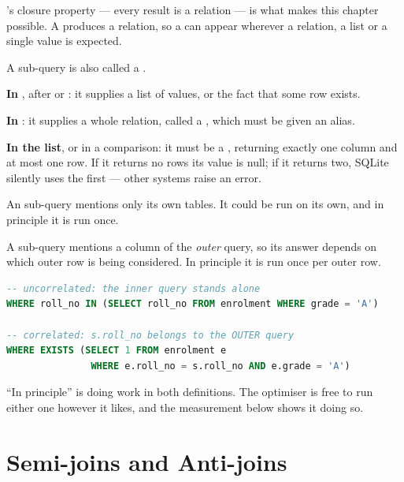 's closure property --- every result is a relation --- is what
makes this chapter possible. A  produces a relation, so a
 can appear wherever a relation, a list or a single value is
expected.

\begin{definitionbox}
A sub-query is also called a .

\smallskip
\textbf{In }, after  or : it supplies a
list of values, or the fact that some row exists.

\smallskip
\textbf{In }: it supplies a whole relation, called a
, which must be given an alias.

\smallskip
\textbf{In the  list}, or in a comparison: it must be a
, returning exactly one column and at most one row. If
it returns no rows its value is null; if it returns two, SQLite silently uses
the first --- other systems raise an error.
\end{definitionbox}

\begin{definitionbox}
An  sub-query mentions only its own tables. It could be run
on its own, and in principle it is run once.

\smallskip
A  sub-query mentions a column of the \emph{outer} query, so
its answer depends on which outer row is being considered. In principle it is
run once per outer row.

\begin{lstlisting}[language=sql]
-- uncorrelated: the inner query stands alone
WHERE roll_no IN (SELECT roll_no FROM enrolment WHERE grade = 'A')

-- correlated: s.roll_no belongs to the OUTER query
WHERE EXISTS (SELECT 1 FROM enrolment e
               WHERE e.roll_no = s.roll_no AND e.grade = 'A')
\end{lstlisting}

\smallskip
``In principle'' is doing work in both definitions. The optimiser is free to
run either one however it likes, and the measurement below shows it doing so.
\end{definitionbox}

\section{Semi-joins and Anti-joins}


